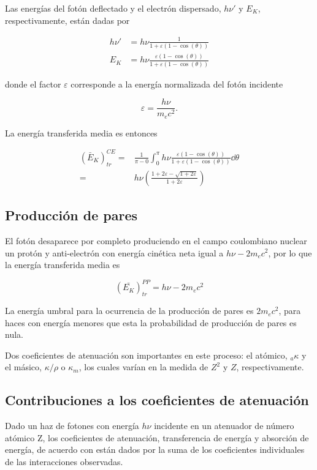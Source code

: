 \documentclass[12pt,letterpaper, oneside]{book}
\begin{document}
	 Las energías del fotón deflectado y el electrón dispersado, $h\nu'$ y $E_K$, respectivamente, están dadas por
	 
	 \begin{eqnarray}
	 	h\nu'&=h\nu \frac{1}{1+\varepsilon(1-\cos(\theta))}\\
	 	E_K&=h\nu \frac{\varepsilon(1-\cos(\theta))}{1+\varepsilon(1-\cos(\theta))}
	 \end{eqnarray} 
	 
	 \noindent donde el factor $\varepsilon$ corresponde a la energía normalizada del fotón incidente
	 
	 $$\varepsilon=\frac{h\nu}{m_e c^2}.$$
	 
	 La energía transferida media es entonces
	 
	 \begin{eqnarray}
	 	\nonumber (\bar{E}_K)_{tr}^{CE}=&\frac{1}{\pi - 0}\int_{0}^{\pi}h\nu \frac{\varepsilon(1-\cos(\theta))}{1+\varepsilon(1-\cos(\theta))}\dd{\theta}\\
	 	=&h\nu \left(\frac{1+2\varepsilon - \sqrt{1+2\varepsilon}}{1+2\varepsilon}\right)\label{energia_media_transferida_compton}
	 \end{eqnarray}
	 
	 \subsection{Producción de pares} 
	 El fotón desaparece por completo produciendo en el campo coulombiano nuclear un protón y anti-electrón con energía cinética neta igual a $h\nu - 2m_ec^2$, por lo que la energía transferida media es
	 
	 \begin{equation}
	 	(\bar{E_K})_{tr}^{PP}=h\nu - 2m_ec^2 \label{energia_media_transferida_prodpares}
	 \end{equation}
	 
	 La energía umbral para la ocurrencia de la producción de pares es $2m_ec^2$, para haces con energía menores que esta la probabilidad de producción de pares es nula\cite{IAEA.2005}. 
	 
	 Dos coeficientes de atenuación son importantes en este proceso: el atómico, $_a\kappa$ y el másico, $\kappa/\rho$ o $\kappa_m$, los cuales varían en la medida de $Z^2$ y $Z$, respectivamente. 
	 
	 \subsection{Contribuciones a los coeficientes de atenuación}
	 Dado un haz de fotones con energía $h\nu$ incidente en un atenuador de número atómico Z, los coeficientes de atenuación, transferencia de energía y absorción de energía, de acuerdo con \cite{IAEA.2005} están dados por la suma de los coeficientes individuales de las interacciones observadas.
	 
\end{document}
